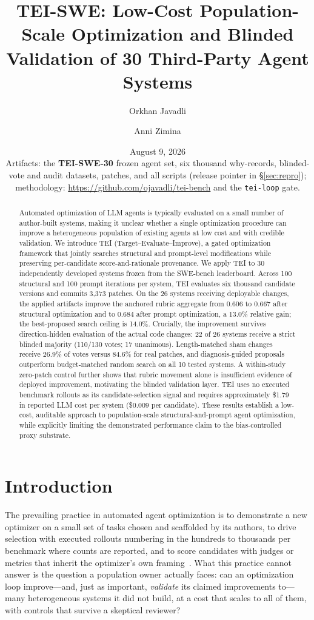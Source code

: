 \documentclass[11pt]{article}
\title{TEI-SWE: Low-Cost Population-Scale Optimization and Blinded Validation
of 30 Third-Party Agent Systems}
\author[1]{Orkhan Javadli}
\author[2]{Anni Zimina}
\affil[1]{Massachusetts Institute of Technology \quad ojavadli@mit.edu}
\affil[2]{Stanford University \quad zimina@stanford.edu}
\date{August 9, 2026\\[2pt]\small Artifacts: the \textbf{TEI-SWE-30} frozen agent set,
six thousand why-records, blinded-vote and audit datasets, patches, and all scripts
(release pointer in \S\ref{sec:repro});\\
\small methodology: \url{https://github.com/ojavadli/tei-bench} and the \texttt{tei-loop} gate.}
\begin{document}
\maketitle

\begin{abstract}
\noindent Automated optimization of LLM agents is typically evaluated on a
small number of author-built systems, making it unclear whether a single
optimization procedure can improve a heterogeneous population of existing
agents at low cost and with credible validation. We introduce TEI
(Target–Evaluate–Improve), a gated optimization framework that jointly searches
structural and prompt-level modifications while preserving per-candidate
score-and-rationale provenance. We apply TEI to 30 independently developed
systems frozen from the SWE-bench leaderboard. Across 100 structural and 100
prompt iterations per system, TEI evaluates six thousand candidate versions and
commits 3,373 patches. On the 26 systems receiving deployable changes, the
applied artifacts improve the anchored rubric aggregate from 0.606 to 0.667
after structural optimization and to 0.684 after prompt optimization, a 13.0\%
relative gain; the best-proposed search ceiling is 14.0\%. Crucially, the
improvement survives direction-hidden evaluation of the actual code changes: 22
of 26 systems receive a strict blinded majority (110/130 votes; 17 unanimous).
Length-matched sham changes receive 26.9\% of votes versus 84.6\% for real
patches, and diagnosis-guided proposals outperform budget-matched random search
on all 10 tested systems. A within-study zero-patch control further shows that
rubric movement alone is insufficient evidence of deployed improvement,
motivating the blinded validation layer. TEI uses no executed benchmark
rollouts as its candidate-selection signal and requires approximately \$1.79 in
reported LLM cost per system (\$0.009 per candidate). These results establish a
low-cost, auditable approach to population-scale structural-and-prompt agent
optimization, while explicitly limiting the demonstrated performance claim to
the bias-controlled proxy substrate.
\end{abstract}

\section{Introduction}
\label{sec:intro}
The prevailing practice in automated agent optimization is to demonstrate a
new optimizer on a small set of tasks chosen and scaffolded by its authors,
to drive selection with executed rollouts numbering in the hundreds to
thousands per benchmark where counts are reported, and to score candidates
with judges or metrics that inherit the optimizer's own
framing~\citep{gepa2025,mipro2024,maestro2025,ace2026,hivemind2026}. What
this practice cannot answer is the question a population owner actually
faces: can an optimization loop improve---and, just as important,
\emph{validate} its claimed improvements to---many heterogeneous systems it
did not build, at a cost that scales to all of them, with controls that
survive a skeptical reviewer?
\end{document}
